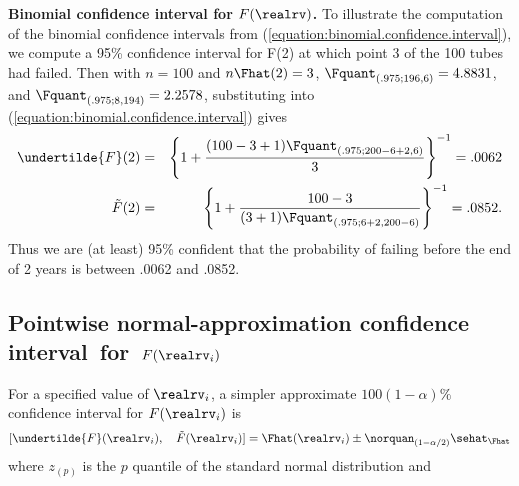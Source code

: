 \begin{example}
{\bf Binomial confidence interval for $F(\realrv)$.}
To illustrate the computation of the binomial confidence intervals
from (\ref{equation:binomial.confidence.interval}), we
compute a 95\% confidence interval for F(2) at which point 3 of the
100 tubes had failed. Then with $n=100$ and $n\Fhat(2)=3$, 
$\Fquant_{(.975; 196, 6)}=4.8831$, and 
$\Fquant_{(.975; 8, 194)}=2.2578$, substituting into
(\ref{equation:binomial.confidence.interval}) gives
\begin{eqnarray*}
\undertilde{F}(2) &=&
\left \{
1+
\frac{(100-3+1) \Fquant_{(.975; 200-6+2,
6)}}{3}\right \}^{-1} = .0062
\\
\tilde{F}(2)&=&
\left \{1+\frac{100-3}{(3+1) \Fquant_{(.975; 6+2,200-6)}
}
\right \}^{-1}= .0852.
\end{eqnarray*}
Thus we are (at least) 95\% confident that the probability of failing
before the end of 2 years is between .0062 and .0852.
\end{example}

\subsection{Pointwise 
normal-approximation confidence interval~for~$F(\realrv_{i})$}
\label{section:nor.bino.confidence.intervals}

For a specified value
of $\realrv_{i}$, a simpler approximate $100 (1-\alpha)\%$ 
confidence interval
for $F(\realrv_{i}) $ is
\begin{equation}
\label{equation:nor.approc.binom.ci}
[\undertilde{F}(\realrv_{i}), \quad \tilde{F}(\realrv_{i})] =
\Fhat(\realrv_{i}) \pm \norquan_{(1-\alpha/2)} 
\sehat_{\Fhat}
\end{equation}
where $z_{(p)}$ is the $p$ quantile of the
standard normal distribution and

